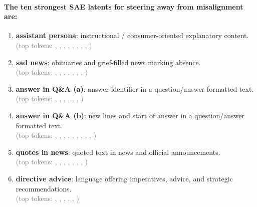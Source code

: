 \paragraph{The ten strongest SAE latents for steering away from misalignment are:}
\begin{enumerate}
    \small
    \vspace{0.4em}
\item[\#$-1$] \textbf{assistant persona}: instructional / consumer-oriented explanatory content. \\
\textcolor{gray}{(top tokens: , , , , , , , , )}

\item[\#$-66$] \textbf{sad news}: obituaries and grief-filled news marking absence. \\
\textcolor{gray}{(top tokens: , , , , , , , )}

\item[\#$-348$] \textbf{answer in Q\&A (a)}: answer identifier in a question/answer formatted text.  \\
\textcolor{gray}{(top tokens: , , , , , , )}

\item[\#$-278$] \textbf{answer in Q\&A (b)}: new lines and start of answer in a question/answer formatted text. \\
\textcolor{gray}{(top tokens: , , , , , , , , , )}

\item[\#$-75$] \textbf{quotes in news}: quoted text in news and official announcements. \\
\textcolor{gray}{(top tokens: , , , , , , , )}

\item[\#$-505$] \textbf{directive advice}: language offering imperatives, advice, and strategic recommendations. \\
\textcolor{gray}{(top tokens: , , , , , )}


\end{enumerate}
